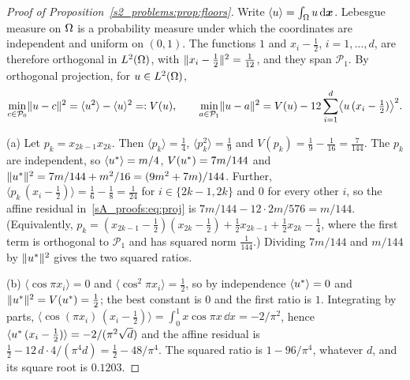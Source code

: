 \begin{proof}[Proof of Proposition~\ref{s2_problems:prop:floors}]
Write $\langle u\rangle=\int_\Omega u\,\mathrm{d}\boldsymbol{x}$. Lebesgue measure on $\Omega$ is a probability
measure under which the coordinates are independent and uniform on $(0,1)$. The functions
$1$ and $x_i-\tfrac12$, $i=1,\dots,d$, are therefore orthogonal in $L^2(\Omega)$, with
$\lVert x_i-\tfrac12\rVert^2=\tfrac1{12}$, and they span $\mathcal{P}_1$. By orthogonal
projection, for $u\in L^2(\Omega)$,
\begin{equation}\label{sA_proofs:eq:proj}
\min_{c\in\mathcal{P}_0}\lVert u-c\rVert^2=\langle u^2\rangle-\langle u\rangle^2=:V(u),
\qquad
\min_{a\in\mathcal{P}_1}\lVert u-a\rVert^2=V(u)-12\sum_{i=1}^d\bigl\langle u\,(x_i-\tfrac12)\bigr\rangle^2 .
\end{equation}

(a) Let $p_k=x_{2k-1}x_{2k}$. Then $\langle p_k\rangle=\tfrac14$,
$\langle p_k^2\rangle=\tfrac19$ and $V(p_k)=\tfrac19-\tfrac1{16}=\tfrac7{144}$. The $p_k$
are independent, so $\langle u^{*}\rangle=m/4$, $V(u^{*})=7m/144$ and
$\lVert u^{*}\rVert^2=7m/144+m^2/16=(9m^2+7m)/144$. Further,
$\langle p_k\,(x_i-\tfrac12)\rangle=\tfrac16-\tfrac18=\tfrac1{24}$ for $i\in\{2k-1,2k\}$ and
$0$ for every other $i$, so the affine residual in~\eqref{sA_proofs:eq:proj} is
$7m/144-12\cdot2m/576=m/144$. (Equivalently,
$p_k=(x_{2k-1}-\tfrac12)(x_{2k}-\tfrac12)+\tfrac12x_{2k-1}+\tfrac12x_{2k}-\tfrac14$, where
the first term is orthogonal to $\mathcal{P}_1$ and has squared norm $\tfrac1{144}$.)
Dividing $7m/144$ and $m/144$ by $\lVert u^{*}\rVert^2$ gives the two squared ratios.

(b) $\langle\cos\pi x_i\rangle=0$ and $\langle\cos^2\pi x_i\rangle=\tfrac12$, so by
independence $\langle u^{*}\rangle=0$ and $\lVert u^{*}\rVert^2=V(u^{*})=\tfrac12$; the best constant
is $0$ and the first ratio is $1$. Integrating by parts,
$\langle\cos(\pi x_i)\,(x_i-\tfrac12)\rangle=\int_0^1x\cos\pi x\,\dd x=-2/\pi^2$, hence
$\langle u^{*}\,(x_i-\tfrac12)\rangle=-2/(\pi^2\sqrt d)$ and the affine residual is
$\tfrac12-12\,d\cdot4/(\pi^4d)=\tfrac12-48/\pi^4$. The squared ratio is $1-96/\pi^4$,
whatever $d$, and its square root is $0.1203$.
\end{proof}

